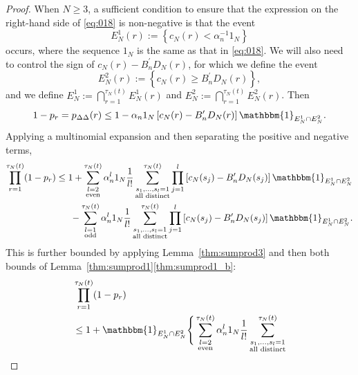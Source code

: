\documentclass[12pt,authoryear]{article}
\theoremstyle{definition}
\newcommand{\1}[1]{\mathbbm{1}_{#1}}
\newcommand{\ON}{1_N}
\begin{document}
\begin{proof}
When $N \geq 3$, a sufficient condition to ensure that the expression on the right-hand side of \eqref{eq:018} is non-negative is that the event
\begin{equation}\label{eq:defn_E1}
E_N^{1}(r) := \left\{ c_N(r) < \alpha_n^{-1} \ON \right\} 
\end{equation}
occurs, where the sequence $\ON$ is the same as that in \eqref{eq:018}.
We will also need to control the sign of $c_N(r) - B_n^\prime D_N(r)$, for which we define the event
\begin{equation}\label{eq:defn_E2}
E_N^2(r) := \left\{ c_N(r) \geq B_n^\prime D_N(r) \right\} ,
\end{equation}
and we define $E_N^1 := \bigcap_{r=1}^{\tau_N(t)} E_N^1(r)$ and $E_N^2 := \bigcap_{r=1}^{\tau_N(t)} E_N^2(r)$.
Then
\begin{equation*}
1-p_r
= p_{\Delta\Delta}(r) \leq 1 - \alpha_n \ON 
        \left[ c_N(r) - B_n^\prime D_N(r) \right] \1{E_N^1 \cap E_N^2} .
\end{equation*}
Applying a multinomial expansion and then separating the positive and negative terms,
\begin{align}
\prod_{r=1}^{\tau_N(t)} (1-p_r)
&\leq 1 + \sum_{\substack{l=2 \\ \text{even} }}^{\tau_N(t)} 
        \alpha_n^l \ON \frac{1}{l!} 
        \sum_{\substack{ s_1, \dots, s_l =1 \\ \text{all distinct} }}^{\tau_N(t)}
        \prod_{j=1}^l
        \left[ c_N(s_j) - B_n^\prime D_N(s_j) \right] \1{E_N^1 \cap E_N^2} \notag\\
    &\phantom{\leq 1} - \sum_{\substack{l=1 \\ \text{odd} }}^{\tau_N(t)} 
        \alpha_n^l \ON \frac{1}{l!} 
        \sum_{\substack{ s_1, \dots, s_l =1 \\ \text{all distinct} }}^{\tau_N(t)}
        \prod_{j=1}^l
        \left[ c_N(s_j) - B_n^\prime D_N(s_j) \right] \1{E_N^1 \cap E_N^2} .
        \label{eq:019}
\end{align}
This is further bounded by applying Lemma~\ref{thm:sumprod3} and then both bounds of Lemma~\ref{thm:sumprod1}\ref{thm:sumprod1_b}:
\begin{align*}
&\prod_{r=1}^{\tau_N(t)} (1-p_r) \\
&\leq 1 + \1{E_N^1 \cap E_N^2} \Bigg\{ 
        \sum_{\substack{l=2 \\ \text{even} }}^{\tau_N(t)} 
        \alpha_n^l \ON \frac{1}{l!} 
        \sum_{\substack{ s_1, \dots, s_l =1 \\ \text{all distinct} }}^{\tau_N(t)}

\end{align*}
\end{proof}
\end{document}
